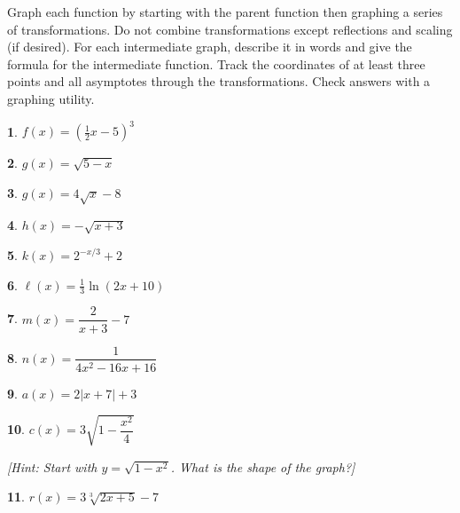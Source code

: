 \documentclass{amsbook}
\newtheorem{exc}{}
\newenvironment{ex}{\begin{exc}\normalfont}{\end{exc}}
\numberwithin{section}{chapter}
\numberwithin{equation}{chapter}
\begin{document}
	Graph each function by starting with the parent function then graphing a series of transformations. Do not combine transformations except reflections and scaling (if desired). For each intermediate graph, describe it in words and give the formula for the intermediate function. Track the coordinates of at least three points and all asymptotes through the transformations. Check answers with a graphing utility.
	\begin{multicols}{2}

	\begin{ex}
	$f(x) = \left(\frac{1}{2}x-5\right)^3$
	\end{ex}
	\begin{ex}
	$g(x) = \sqrt{5-x}$
\end{ex}
	\begin{ex}
	$g(x) = 4\sqrt{x}-8$
\end{ex}
	\begin{ex}
	$h(x) = -\sqrt{x+3}$
\end{ex}
	\begin{ex}
	$k(x) = 2^{-x/3}+2$
\end{ex}
	\begin{ex}
	$\ell(x) = \frac{1}{3}\ln(2x+10)$
\end{ex}
	\begin{ex}
	$m(x) = \dfrac{2}{x+3}-7$
\end{ex}
	\begin{ex}
	$n(x) = \dfrac{1}{4x^2-16x+16}$
\end{ex}
	\begin{ex}
	$a(x) = 2|x+7|+3$
\end{ex}
	\begin{ex}
	$c(x) = 3\sqrt{1-\dfrac{x^2}{4}}$
	
	[Hint: Start with $y=\sqrt{1-x^2}$. What is the shape of the graph?] 
\end{ex}
\begin{ex}
$r(x) = 3\sqrt[3]{2x+5}-7$
\end{ex}
	\end{multicols}
\end{document}
